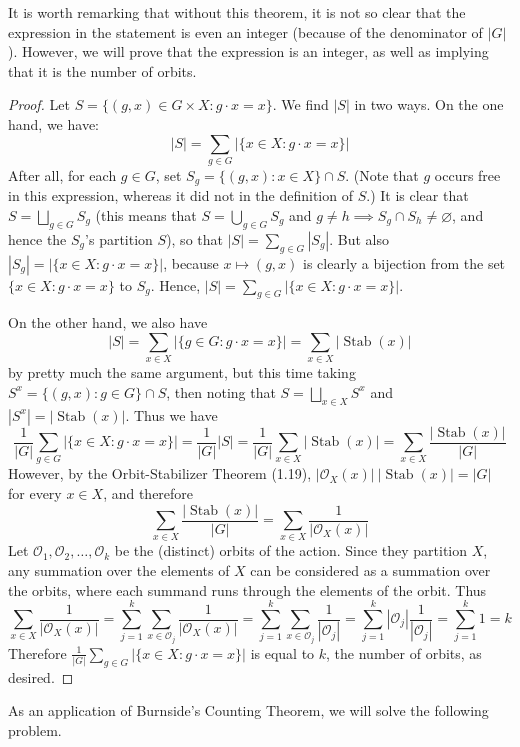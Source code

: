 \documentclass[leqno]{book}
\begin{document}
\noindent It is worth remarking that without this theorem, it is not so clear that the expression in the statement is even an integer (because of the denominator of $|G|$).  However, we will prove that the expression is an integer, as well as implying that it is the number of orbits.
\begin{proof}
Let $S=\{(g,x)\in G\times X:g\cdot x=x\}$.  We find $|S|$ in two ways.  On the one hand, we have:
$$|S|=\sum_{g\in G}|\{x\in X:g\cdot x=x\}|$$
After all, for each $g\in G$, set $S_g=\{(g,x):x\in X\}\cap S$.  (Note that $g$ occurs free in this expression, whereas it did not in the definition of $S$.)  It is clear that $S=\bigsqcup_{g\in G}S_g$ (this means that $S=\bigcup_{g\in G}S_g$ and $g\ne h\implies S_g\cap S_h\ne\varnothing$, and hence the $S_g$'s partition $S$), so that $|S|=\sum_{g\in G}|S_g|$.  But also $|S_g|=|\{x\in X:g\cdot x=x\}|$, because $x\mapsto(g,x)$ is clearly a bijection from the set $\{x\in X:g\cdot x=x\}$ to $S_g$.  Hence, $|S|=\sum_{g\in G}|\{x\in X:g\cdot x=x\}|$.

On the other hand, we also have
$$|S|=\sum_{x\in X}|\{g\in G:g\cdot x=x\}|=\sum_{x\in X}|\operatorname{Stab}(x)|$$
by pretty much the same argument, but this time taking $S^x=\{(g,x):g\in G\}\cap S$, then noting that $S=\bigsqcup_{x\in X}S^x$ and $|S^x|=|\operatorname{Stab}(x)|$.  Thus we have
$$\frac 1{|G|}\sum_{g\in G}|\{x\in X:g\cdot x=x\}|=\frac 1{|G|}|S|=\frac 1{|G|}\sum_{x\in X}|\operatorname{Stab}(x)|=\sum_{x\in X}\frac{|\operatorname{Stab}(x)|}{|G|}$$
However, by the Orbit-Stabilizer Theorem (1.19), $|\mathcal O_X(x)|~|\operatorname{Stab}(x)|=|G|$ for every $x\in X$, and therefore
$$\sum_{x\in X}\frac{|\operatorname{Stab}(x)|}{|G|}=\sum_{x\in X}\frac 1{|\mathcal O_X(x)|}$$
Let $\mathcal O_1,\mathcal O_2,\dots,\mathcal O_k$ be the (distinct) orbits of the action.  Since they partition $X$, any summation over the elements of $X$ can be considered as a summation over the orbits, where each summand runs through the elements of the orbit.  Thus
$$\sum_{x\in X}\frac 1{|\mathcal O_X(x)|}=\sum_{j=1}^k\sum_{x\in\mathcal O_j}\frac 1{|\mathcal O_X(x)|}=\sum_{j=1}^k\sum_{x\in\mathcal O_j}\frac 1{|\mathcal O_j|}=\sum_{j=1}^k|\mathcal O_j|\frac 1{|\mathcal O_j|}=\sum_{j=1}^k1=k$$
Therefore $\frac 1{|G|}\sum_{g\in G}|\{x\in X:g\cdot x=x\}|$ is equal to $k$, the number of orbits, as desired.
\end{proof}

\noindent As an application of Burnside's Counting Theorem, we will solve the following problem.
\end{document}
